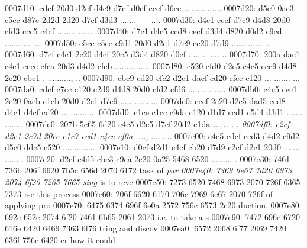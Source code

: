 \begin{bo
00010e0: 7865 647d 5c62 6567 696e 7b76 6572 6261  xed}
\begin{verba
00010f0: 7469 6d7d 0a20 2023 7479 7065 2074 6572  tim}
\begin{
0001c40: 7665 7262 6174 696d 7d0a 2020 236c 6574  verbatim}
\begin{boxe
00027a0: 647d 5c62 6567 696e 7b76 6572 6261 7469  d}
\begin{verbati
00027b0: 6d7d 0a20 2023 6c65 7420 696e 6669 7865  m}
\begin{v
0002c60: 6572 6261 7469 6d7d 0a20 2023 6c65 7420  erbatim}
\begin{
0002dc0: 7665 7262 6174 696d 7d0a 2020 236c 6574  verbatim}
\begin{boxed
0002f30: 7d5c 6265 6769 6e7b 7665 7262 6174 696d  }
\begin{verbatim
0002f40: 7d0a 2020 236c 6574 2068 6428 683a 3a74  }
\begin{v
0003e60: 6572 6261 7469 6d7d 0a20 2023 236f 7065  erbatim}
\begin{boxed
00042b0: 7d5c 6265 6769 6e7b 7665 7262 6174 696d  }
\begin{verbatim
00042c0: 7d0a 2020 2328 782c 7429 3b3b 0a20 202d  }
\begin{boxed}
0007d10: cdcf 20d0 d2cf d4c9 d7cf d0cf cccf d6ce  .. .............
0007d20: d5c0 0ac3 c5cc d87e 2d2d 2d20 d7cf d3d3  .......~--- ....
0007d30: d4c1 cecf d7c9 d4d8 20d0 cfd3 ccc5 c4cf  ........ .......
0007d40: d7c1 d4c5 ccd8 cecf d3d4 d820 d0d2 c9cd  ........... ....
0007d50: c5ce c5ce c9d1 20d0 d2c1 d7c9 cc20 d7d9  ...... ...... ..
0007d60: d7cf c4c1 2c20 d4cf 20c5 d3d4 d820 d0cf  ...., .. .... ..
0007d70: 200a dac1 c4c1 cece cfca 20d3 d4d2 cfcb   ......... .....
0007d80: c520 cfd0 d2c5 c4c5 ccc9 d4d8 2c20 cbc1  . .........., ..
0007d90: cbc9 cd20 cfc2 d2c1 dacf cd20 cfce c120  ... ....... ... 
0007da0: cdcf c7cc c120 c2d9 d4d8 20d0 cfd2 cfd6  ..... .... .....
0007db0: c4c5 cec1 2e20 0aeb c1cb 20d0 d2c1 d7c9  ..... .... .....
0007dc0: cccf 2c20 d2c5 dad5 ccd8 d4c1 d4cf cd20  .., ........... 
0007dd0: c1ce c1cc c9da c120 d1d7 ccd1 c5d4 d3d1  ....... ........
0007de0: 207b 5c65 6d20 c4c5 d2c5 d7cf 20d2 c1da   {\em ...... ...
0007df0: c2cf d2c1 2c7d 20ce c1c7 ccd1 c4ce cf0a  ....,} .........
0007e00: c4c5 cdcf ced3 d4d2 c9d2 d5c0 ddc5 c520  ............... 
0007e10: d0cf d2d1 c4cf cb20 d7d9 c2cf d2c1 20d0  ....... ...... .
0007e20: d2cf c4d5 cbc3 c9ca 2e20 0a25 5468 6520  ......... .%
0007e30: 7461 736b 206f 6620 7b5c 656d 2070 6172  task of {\em par
0007e40: 7369 6e67 7d20 6973 2074 6f20 7265 7665  sing} is to reve
0007e50: 7273 6520 7468 6973 2070 726f 6365 7373  rse this process
0007e60: 206f 6620 6170 706c 7969 6e67 2070 726f   of applying pro
0007e70: 6475 6374 696f 6e0a 2572 756c 6573 2c20  duction.%
0007e80: 692e 652e 2074 6f20 7461 6b65 2061 2073  i.e. to take a s
0007e90: 7472 696e 6720 616e 6420 6469 7363 6f76  tring and discov
0007ea0: 6572 2068 6f77 2069 7420 636f 756c 6420  er how it could 

\end{boxed}
\end{verbatim
00042c0: 7d0a 2020 2328 782c 7429 3b3b 0a20 202d  }
\end{boxed
00042b0: 7d5c 6265 6769 6e7b 7665 7262 6174 696d  }
\end{v
0003e60: 6572 6261 7469 6d7d 0a20 2023 236f 7065  erbatim}
\end{verbatim
0002f40: 7d0a 2020 236c 6574 2068 6428 683a 3a74  }
\end{boxed
0002f30: 7d5c 6265 6769 6e7b 7665 7262 6174 696d  }
\end{
0002dc0: 7665 7262 6174 696d 7d0a 2020 236c 6574  verbatim}
\end{v
0002c60: 6572 6261 7469 6d7d 0a20 2023 6c65 7420  erbatim}
\end{verbati
00027b0: 6d7d 0a20 2023 6c65 7420 696e 6669 7865  m}
\end{boxe
00027a0: 647d 5c62 6567 696e 7b76 6572 6261 7469  d}
\end{
0001c40: 7665 7262 6174 696d 7d0a 2020 236c 6574  verbatim}
\end{verba
00010f0: 7469 6d7d 0a20 2023 7479 7065 2074 6572  tim}
\end{bo
00010e0: 7865 647d 5c62 6567 696e 7b76 6572 6261  xed}

